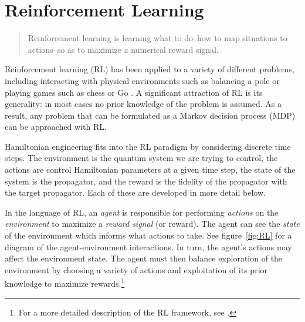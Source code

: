 
\chapter{Reinforcement Learning}



\begin{quote}
    Reinforcement learning is learning what to do--how to map situations to actions--so as to maximize a numerical reward signal. \cite{sutton2018reinforcement}
\end{quote}
Reinforcement learning  (RL) has been applied to a variety of different problems, including interacting with physical environments such as balancing a pole \cite{lillicrap2015continuous} or playing games such as chess or Go \cite{Silver1140}. A significant attraction of RL is its generality: in most cases no prior knowledge of the problem is assumed. As a result, any problem that can be formulated as a Markov decision process (MDP) can be approached with RL.

Hamiltonian engineering fits into the RL paradigm by considering discrete time steps. The environment is the quantum system we are trying to control, the actions are control Hamiltonian parameters at a given time step, the state of the system is the propagator, and the reward is the fidelity of the propagator with the target propagator.  Each of these are developed in more detail below.


In the language of RL, an \emph{agent} is responsible for performing \emph{actions} on the \emph{environment} to maximize a \emph{reward signal} (or reward). The agent can see the \emph{state} of the environment which informs what actions to take. See figure~\ref{fig:RL} for a diagram of the agent-environment interactions. In turn, the agent's actions may affect the environment state. The agent must then balance exploration of the environment by choosing a variety of actions and exploitation of its prior knowledge to maximize rewards.\footnote{
For a more detailed description of the RL framework, see \cite{sutton2018reinforcement}.
}

